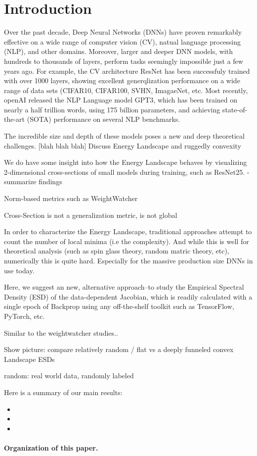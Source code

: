 \section{Introduction}
\label{sxn:intro}

Over the past decade, Deep Neural Networks (DNNs) have proven remarkably effective on a wide range of 
computer vision (CV), natual language processing (NLP), and other domains.  
Moreover, larger and deeper DNN models, with hundreds to thousands of layers, perform tasks
seemingly impossible just a few years ago.  
For example, the CV architecture ResNet has been successfuly trained with over 1000 layers,
showing excellent generqlization performance on a wide range of data sets (CIFAR10, CIFAR100, SVHN, ImagaeNet, etc.
Most recently, openAI released the NLP Language model GPT3, which has been trained on nearly a half trillion words,
using 175 billion parameters, and achieving state-of-the-art (SOTA) performance on several NLP
benchmarks.  

The incredible size and depth of these models poses a new and deep theoretical challenges.
[blah blah blah]
Discuss Energy Landscape and  ruggedly convexity


We do have some insight into how the Energy Landscape behaves by visualizing 2-dimensional
cross-sections of small models during training, such as ResNet25.
-summarize findings

Norm-based metrics such as WeightWatcher

Cross-Section is not a generalization metric, is not global

In order to characterize the Energy Landscape, traditional approaches attempt to count
the number of local minima (i.e the complexity).  And while this is well for theoretical
analysis (such as spin glass theory, random matric theory, etc), numerically this
is quite hard.  Especially for the massive production size DNNs in use today.

Here, we suggest an new, alternative approach--to study the Empirical Spectral Density (ESD)
of the data-dependent Jacobian, which is readily calculated with a single epoch of Backprop
using any off-the-shelf toolkit such as TensorFlow, PyTorch, etc. 

Similar to the weightwatcher studies..

Show picture:  compare relatively random / flat vs  a deeply funneled convex Landscape ESDs

random:  real world data, randomly labeled 


Here is a summary of our main results:
\begin{itemize}
\item

\item

\item 

\end{itemize}


\paragraph{Organization of this paper.}



